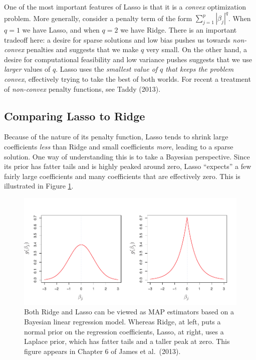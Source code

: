\documentclass[12pt]{article}
\theoremstyle{definition}
\begin{document}
One of the most important features of Lasso is that it is a \emph{convex} optimization problem. More generally, consider a penalty term of the form $\sum_{j=1}^p |\beta_j|^q$. When $q=1$ we have Lasso, and when $q = 2$ we have Ridge.  There is an important tradeoff here: a desire for sparse solutions and low bias pushes us towards \emph{non-convex} penalties and suggests that we make $q$ very small. On the other hand, a desire for computational feasibility and low variance pushes suggests that we use \emph{larger} values of $q$. Lasso uses the \emph{smallest value of $q$ that keeps the problem convex}, effectively trying to take the best of both worlds. For recent a treatment of \emph{non-convex} penalty functions, see Taddy (2013).

\subsection{Comparing Lasso to Ridge}
Because of the nature of its penalty function, Lasso tends to shrink large coefficients \emph{less} than Ridge and small coefficients \emph{more}, leading to a sparse solution. One way of understanding this is to take a Bayesian perspective. Since its prior has fatter tails and is highly peaked around zero, Lasso ``expects'' a few fairly large coefficients and many coefficients that are effectively zero. This is illustrated in Figure \ref{fig:ridge_lasso_prior}.

\begin{figure}
	\centering
	\includegraphics[scale=0.85]{ISLR_ch6_fig11}
	\caption{Both Ridge and Lasso can be viewed as MAP estimators based on a Bayesian linear regression model. Whereas Ridge, at left, puts a normal prior on the regression coefficients, Lasso, at right, uses a Laplace prior, which has fatter tails and a taller peak at zero. This figure appears in Chapter 6 of James et al.\ (2013).}
	\label{fig:ridge_lasso_prior}
\end{figure}
\end{document}
